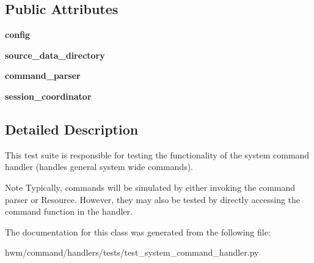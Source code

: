 \subsection*{Public Attributes}
\begin{DoxyCompactItemize}
\item 
\hypertarget{classhwm_1_1command_1_1handlers_1_1tests_1_1test__system__command__handler_1_1_test_system_command_handler_ac1afda4838faf7c0318adb203839386c}{{\bfseries config}}\label{classhwm_1_1command_1_1handlers_1_1tests_1_1test__system__command__handler_1_1_test_system_command_handler_ac1afda4838faf7c0318adb203839386c}

\item 
\hypertarget{classhwm_1_1command_1_1handlers_1_1tests_1_1test__system__command__handler_1_1_test_system_command_handler_ace4050965232a56db1616a67f03ee6ab}{{\bfseries source\-\_\-data\-\_\-directory}}\label{classhwm_1_1command_1_1handlers_1_1tests_1_1test__system__command__handler_1_1_test_system_command_handler_ace4050965232a56db1616a67f03ee6ab}

\item 
\hypertarget{classhwm_1_1command_1_1handlers_1_1tests_1_1test__system__command__handler_1_1_test_system_command_handler_a7de055f0d8b232750148afadebbdc86c}{{\bfseries command\-\_\-parser}}\label{classhwm_1_1command_1_1handlers_1_1tests_1_1test__system__command__handler_1_1_test_system_command_handler_a7de055f0d8b232750148afadebbdc86c}

\item 
\hypertarget{classhwm_1_1command_1_1handlers_1_1tests_1_1test__system__command__handler_1_1_test_system_command_handler_a89619cfcf77ceb31ffb47383247695c1}{{\bfseries session\-\_\-coordinator}}\label{classhwm_1_1command_1_1handlers_1_1tests_1_1test__system__command__handler_1_1_test_system_command_handler_a89619cfcf77ceb31ffb47383247695c1}

\end{DoxyCompactItemize}


\subsection{Detailed Description}
This test suite is responsible for testing the functionality of the system command handler (handles general system wide commands). 

\begin{DoxyNote}{Note}
Typically, commands will be simulated by either invoking the command parser or Resource. However, they may also be tested by directly accessing the command function in the handler. 
\end{DoxyNote}


The documentation for this class was generated from the following file\-:\begin{DoxyCompactItemize}
\item 
hwm/command/handlers/tests/test\-\_\-system\-\_\-command\-\_\-handler.\-py\end{DoxyCompactItemize}
